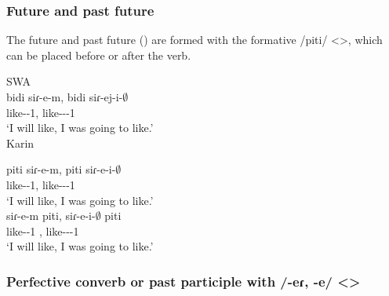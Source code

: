 \subsubsection{Future and past future}

The future and past future () are formed with the formative /piti/ <>, which can be placed before or after the verb. 



\begin{exe}
	\ex  \label{sent:Karin:morpho:verb:fut}
	\begin{xlist}
	\ex SWA \\
 \gll bidi siɾ-e-m, bidi siɾ-ej-i-$\emptyset$ \\
	{\fut} like-{\thgloss}-1{\sg}, {\fut} like-{\thgloss}-{\pst}-1{\sg} \\
	\trans `I will like, I was going to like.' \\
	\ex Karin
	\begin{xlist}
\ex \gll piti siɾ-e-m, piti siɾ-e-i-$\emptyset$ \\
{\fut} like-{\thgloss}-1{\sg}, {\fut} like-{\thgloss}-{\pst}-1{\sg} \\
\trans `I will like, I was going to like.' \\
\ex \gll siɾ-e-m piti, siɾ-e-i-$\emptyset$ piti\\
like-{\thgloss}-1{\sg} {\fut}, like-{\thgloss}-{\pst}-1{\sg} {\fut} \\
\trans `I will like, I was going to like.' \\
	\end{xlist}	
	\end{xlist}
\end{exe}


\subsubsection{Perfective converb or past participle with /-eɾ, -e/ <>}

